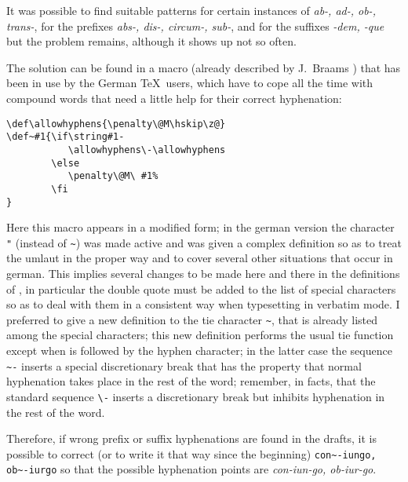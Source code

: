 \documentclass{ltugboat}
\begin{document}
It was possible to find suitable patterns for certain instances of {\it ab-,
ad-, ob-, trans-}, for the prefixes {\it abs-, dis-, circum-, sub-}, and for
the  suffixes {\it -dem, -que} but the problem remains, although it shows up
not so often.

The  solution  can  be  found  in  a  macro  (already described by J.~Braams
\cite{braams}) that has been in use by the German \TeX\ users, which have to
cope  all  the  time  with  compound words that need a little help for their
correct hyphenation:
 \begin{verbatim}
\def\allowhyphens{\penalty\@M\hskip\z@}
\def~#1{\if\string#1-
           \allowhyphens\-\allowhyphens
        \else
           \penalty\@M\ #1%
        \fi
}
\end{verbatim}

Here  this  macro  appears  in  a  modified  form; in the german version the
character \verb|"| (instead of \verb|~|) was made active  and  was  given  a
complex  definition so as to treat the umlaut in the proper way and to cover
several other situations that occur in german. This implies several  changes
to  be  made  here and there in the definitions of \plain, in particular the
double quote must be added to the list of special characters so as  to  deal
with them in a consistent way when typesetting in verbatim mode. I preferred
to give a new definition to the tie  character  \verb|~|,  that  is  already
listed  among the special characters; this new definition performs the usual
tie function except when is followed by the hyphen character; in the  latter
case  the  sequence \verb|~-| inserts a special discretionary break that has
the property that normal hyphenation takes place in the rest  of  the  word;
remember,   in  facts,  that  the  standard  sequence  \verb|\-|  inserts  a
discretionary break but inhibits hyphenation in the rest of the word.

Therefore,  if  wrong prefix or suffix hyphenations are found in the drafts,
it is possible to correct (or to write it  that  way  since  the  beginning)
\verb|con~-iungo,  ob~-iurgo|  so  that  the possible hyphenation points are
{\it con-iun-go, ob-iur-go}.
\end{document}

